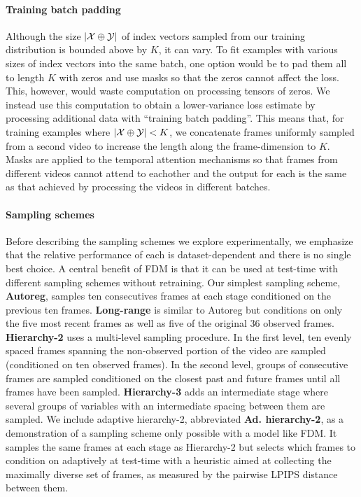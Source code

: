 \paragraph{Training batch padding}
Although the size $|\mathcal{X}\oplus\mathcal{Y}|$ of index vectors sampled from our training distribution is bounded above by $K$, it can vary. To fit examples with various sizes of index vectors into the same batch, one option would be to pad them all to length $K$ with zeros and use masks so that the zeros cannot affect the loss. This, however, would waste computation on processing tensors of zeros.
%
We instead use this computation to obtain a lower-variance loss estimate by processing additional data with ``training batch padding''.
%
This means that, for training examples where $|\mathcal{X}\oplus\mathcal{Y}| < K$, we concatenate frames uniformly sampled from a second video to increase the length along the frame-dimension to $K$. Masks are applied to the temporal attention mechanisms so that frames from different videos cannot attend to eachother and the output for each is the same as that achieved by processing the videos in different batches.

\paragraph{Sampling schemes}
Before describing the sampling schemes we explore experimentally, we emphasize that the relative performance of each is dataset-dependent and there is no single best choice. A central benefit of FDM is that it can be used at test-time with different sampling schemes without retraining. Our simplest sampling scheme, \textbf{Autoreg}, samples ten consecutives frames at each stage conditioned on the previous ten frames. \textbf{Long-range} is similar to Autoreg but conditions on only the five most recent frames as well as five of the original 36 observed frames. \textbf{Hierarchy-2} uses a multi-level sampling procedure. In the first level, ten evenly spaced frames spanning the non-observed portion of the video are sampled (conditioned on ten observed frames). In the second level, groups of consecutive frames are sampled conditioned on the closest past and future frames until all frames have been sampled. \textbf{Hierarchy-3} adds an intermediate stage where several groups of variables with an intermediate spacing between them are sampled. We include adaptive hierarchy-2, abbreviated \textbf{Ad. hierarchy-2}, as a demonstration of a sampling scheme only possible with a model like FDM. It samples the same frames at each stage as Hierarchy-2 but selects which frames to condition on adaptively at test-time with a heuristic aimed at collecting the maximally diverse set of frames, as measured by the pairwise LPIPS distance~\cite{zhang2018unreasonable} between them.

